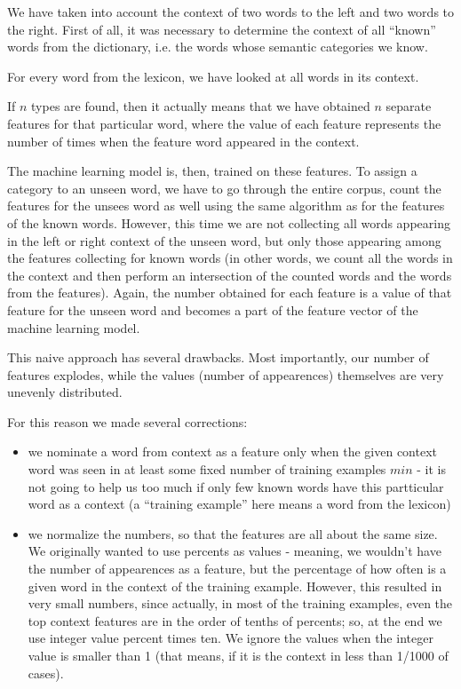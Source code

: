 \documentclass[letterpaper]{article}
\newcommand{\todofn}[1] {
 \footnote{\textbf{TODO : #1}}}
\begin{document}
We have taken into account the context of two words to the left and two words to the right. 
First of all, it was necessary to determine the context of all ``known'' words from the dictionary, i.e. the words whose semantic categories we know.  

For every word from the lexicon, we 
have looked at all words in its context.

If $n$ types are found, then it actually means that we have obtained $n$ separate 
features for that particular word, where the value of each feature represents 
the number of times when the feature word appeared in the context.
 
The machine learning model is, then, trained on these features. To assign a category
to an unseen word, we have to go through the entire corpus, count
the features for the unsees word as well using the same algorithm as for the features of the known words. However, this time we are not collecting all words appearing in the left or right context of the unseen word, but only those appearing among the features collecting for known words (in other words, we count all the words in the context and then perform an 
intersection of the counted words and the words from the features). Again, the number obtained for each feature is a value of that feature for the unseen word and becomes a part of the feature vector of the machine learning model.

This naive approach has several drawbacks. Most importantly, our number of features explodes, while the values (number of appearences) themselves are very unevenly distributed.

For this reason we made several corrections:
\begin{itemize}
    \item we nominate a word from context as a feature only when the given context word was seen in at least some fixed number of training examples $min$ - it is not going to help us too much 
if only few known words have this partticular word as a context (a ``training example'' here means a word from the lexicon)
    
    \item we normalize the numbers, so that the features are all about 
the same size. We originally wanted to use percents as values - meaning, 
we wouldn't have the number of appearences as a feature, but the percentage of how often is a given word in the context of the training example.    
     However, this resulted in very small numbers, since actually, 
in most of the training examples, even the top context features are in the order of 
tenths of percents; so, at the end we use integer value percent times ten. 
We ignore the values when the integer value is smaller than 1 (that means, if it is the context in less than 1/1000 of cases).
     

\end{itemize}
\end{document}
